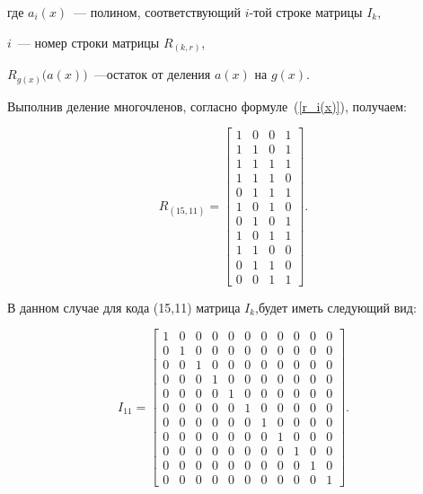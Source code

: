 \begin{ESKDexplanation}
\item[где ] $a_i(x)$~--- полином, соответствующий $i$-той строке
  матрицы $I_k$, 
\item $i$~--- номер строки матрицы $R_{(k, r)}$, 
\item $R_{g(x)}\bigl(a(x)\bigr)$~---остаток от деления $a(x)$ на $g(x)$.
\end{ESKDexplanation}

Выполнив деление многочленов, согласно формуле~(\ref{r_i(x)}),
получаем:

\begin{equation*}
  R_{(15, 11)} =  \left[
    \begin{array}{cccc}
      1 & 0 & 0 & 1 \\
      1 & 1 & 0 & 1 \\
      1 & 1 & 1 & 1 \\
      1 & 1 & 1 & 0 \\
      0 & 1 & 1 & 1 \\
      1 & 0 & 1 & 0 \\
      0 & 1 & 0 & 1 \\
      1 & 0 & 1 & 1 \\
      1 & 1 & 0 & 0 \\
      0 & 1 & 1 & 0 \\
      0 & 0 & 1 & 1  
    \end{array}
  \right].
\end{equation*}


В данном случае для кода (15,11) матрица $I_k$,будет иметь следующий
вид:

\begin{equation*}
  I_{11} =  \left[
    \begin{array}{cccccccccccc}
      1 & 0 & 0 & 0 & 0 & 0 & 0 & 0 & 0 & 0 & 0\\
      0 & 1 & 0 & 0 & 0 & 0 & 0 & 0 & 0 & 0 & 0\\
      0 & 0 & 1 & 0 & 0 & 0 & 0 & 0 & 0 & 0 & 0\\
      0 & 0 & 0 & 1 & 0 & 0 & 0 & 0 & 0 & 0 & 0\\
      0 & 0 & 0 & 0 & 1 & 0 & 0 & 0 & 0 & 0 & 0\\
      0 & 0 & 0 & 0 & 0 & 1 & 0 & 0 & 0 & 0 & 0\\
      0 & 0 & 0 & 0 & 0 & 0 & 1 & 0 & 0 & 0 & 0\\
      0 & 0 & 0 & 0 & 0 & 0 & 0 & 1 & 0 & 0 & 0\\
      0 & 0 & 0 & 0 & 0 & 0 & 0 & 0 & 1 & 0 & 0\\
      0 & 0 & 0 & 0 & 0 & 0 & 0 & 0 & 0 & 1 & 0\\
      0 & 0 & 0 & 0 & 0 & 0 & 0 & 0 & 0 & 0 & 1 
    \end{array}
  \right].
\end{equation*}

